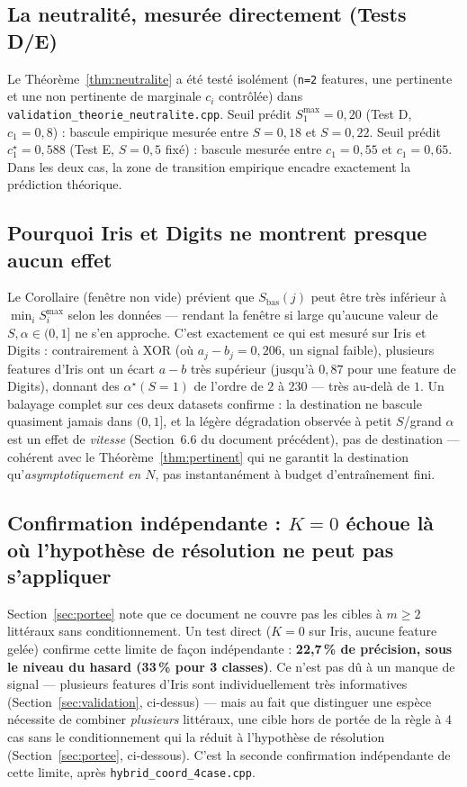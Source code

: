 \documentclass[12pt,a4paper]{article}
\theoremstyle{remark}
\begin{document}
\subsection{La neutralité, mesurée directement (Tests D/E)}

Le Théorème~\ref{thm:neutralite} a été testé isolément (\texttt{n=2} features,
une pertinente et une non pertinente de marginale $c_i$ contrôlée) dans
\texttt{validation\_theorie\_neutralite.cpp}. Seuil prédit $S_1^{\max}=0{,}20$
(Test D, $c_1=0{,}8$) : bascule empirique mesurée entre $S=0{,}18$ et $S=0{,}22$.
Seuil prédit $c_1^\star=0{,}588$ (Test E, $S=0{,}5$ fixé) : bascule mesurée
entre $c_1=0{,}55$ et $c_1=0{,}65$. Dans les deux cas, la zone de transition
empirique encadre exactement la prédiction théorique.

\subsection{Pourquoi Iris et Digits ne montrent presque aucun effet}

Le Corollaire (fenêtre non vide) prévient que $S_{\text{bas}}(j)$ peut être
très inférieur à $\min_i S_i^{\max}$ selon les données --- rendant la fenêtre
si large qu'aucune valeur de $S,\alpha\in(0,1]$ ne s'en approche. C'est
exactement ce qui est mesuré sur Iris et Digits : contrairement à XOR (où
$a_j-b_j=0{,}206$, un signal faible), plusieurs features d'Iris ont un écart
$a-b$ très supérieur (jusqu'à $0{,}87$ pour une feature de Digits), donnant des
$\alpha^\star(S{=}1)$ de l'ordre de $2$ à $230$ --- très au-delà de $1$. Un
balayage complet sur ces deux datasets confirme : la destination ne bascule
quasiment jamais dans $(0,1]$, et la légère dégradation observée à petit
$S$/grand $\alpha$ est un effet de \emph{vitesse} (Section~6.6 du document
précédent), pas de destination --- cohérent avec le Théorème~\ref{thm:pertinent}
qui ne garantit la destination qu'\emph{asymptotiquement en $N$}, pas
instantanément à budget d'entraînement fini.

\subsection{Confirmation indépendante : $K=0$ échoue là où l'hypothèse de résolution ne peut pas s'appliquer}

Section~\ref{sec:portee} note que ce document ne couvre pas les cibles à
$m\ge2$ littéraux sans conditionnement. Un test direct ($K=0$ sur Iris, aucune
feature gelée) confirme cette limite de façon indépendante :
\textbf{22,7\,\% de précision, sous le niveau du hasard (33\,\% pour 3
classes)}. Ce n'est pas dû à un manque de signal --- plusieurs features d'Iris
sont individuellement très informatives (Section~\ref{sec:validation},
ci-dessus) --- mais au fait que distinguer une espèce nécessite de combiner
\emph{plusieurs} littéraux, une cible hors de portée de la règle à 4 cas sans
le conditionnement qui la réduit à l'hypothèse de résolution
(Section~\ref{sec:portee}, ci-dessous). C'est la seconde confirmation
indépendante de cette limite, après \texttt{hybrid\_coord\_4case.cpp}.
\end{document}
